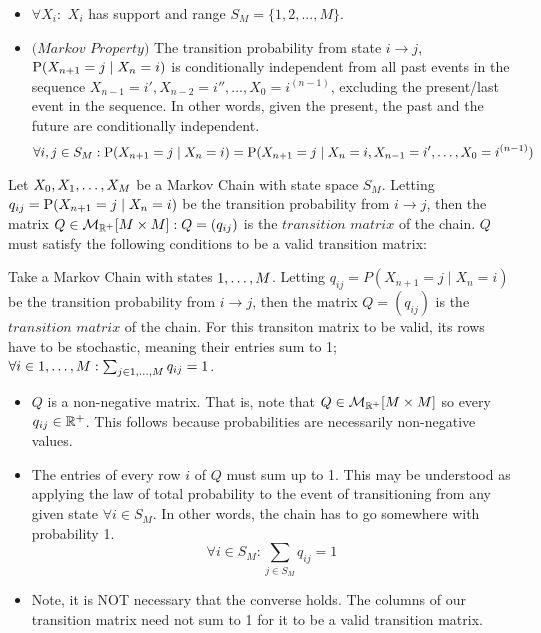 \begin{itemize}
\item $\forall X_i:$ $X_i$ has support and range $S_M = \{1,2,...,M\}$.
\item $\textit{(Markov Property)}$ The transition probability from state $i \to j$, $\Prb(X_{n+1} = j \mid X_n = i)$ is conditionally independent from all past events in the sequence $X_{n-1} = i',X_{n-2} = i'', \dots,X_0 = i^{(n-1)}$, excluding the present/last event in the sequence. In other words, given the present, the past and the future are conditionally independent.
$$\forall i,j \in S_M: \Prb(X_{n+1} = j \mid X_n = i) = \Prb(X_{n+1} = j \mid X_n = i, X_{n-1} = i', \dots,X_0 = i^{(n-1)})$$
\end{itemize}

\begin{definition}  Let $\seq[M]{X}$ be a Markov Chain with state space $S_M$. Letting $q_{ij} = \Prb(X_{n+1} = j \mid X_n = i)$ be the transition probability from $i \to j$, then the matrix $Q \in \mathcal{M}_{\R^+}[M\times M]: Q=(q_{ij})$ is the $\textit{transition matrix}$ of the chain. $Q$ must satisfy the following conditions to be a valid transition matrix:
\end{definition}

\begin{definition}
Take a Markov Chain with states $\oneto[M]$. Letting $q_{ij} = P(X_{n+1} = j \mid X_n = i)$ be the transition probability from $i \to j$, then the matrix $Q=(q_{ij})$ is the $\textit{transition matrix}$ of the chain. For this transiton matrix to be valid, its rows have to be stochastic, meaning their entries sum to 1; $\forall i \in \oneto[M]: \sum_{j \in \oneto[M]} q_{ij} = 1$.
\end{definition}

\begin{itemize}
\item $Q$ is a non-negative matrix. That is, note that $Q \in \mathcal{M}_{\R^+}[M\times M]$ so every $q_{ij} \in \R^+$. This follows because probabilities are necessarily non-negative values.
\item The entries of every row $i$ of $Q$ must sum up to 1. This may be understood as applying the law of total probability to the event of transitioning from any given state $\forall i \in S_M$. In other words, the chain has to go somewhere with probability 1.
$$\forall i \in S_M: \sum_{j \in S_M} q_{ij} = 1$$
\item Note, it is NOT necessary that the converse holds. The columns of our transition matrix need not sum to 1 for it to be a valid transition matrix.
\end{itemize}

